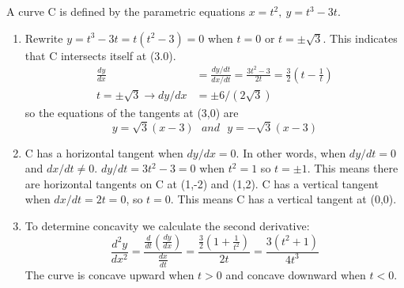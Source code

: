     \begin{solution}
      A curve C is defined by the parametric equations $ x=t^2 ,\ y=t^3 -3t $.
      \begin{enumerate}
        \item Rewrite $ y=t^3 -3t = t(t^2 -3) = 0 $ when $t=0$ or $t= \pm\sqrt{3} $. This indicates that C intersects itself at (3.0).
        \begin{align*}
          \frac{dy}{dx} &= \frac{dy/dt}{dx/dt} = \frac{3t^2 - 3}{2t} = \frac{3}{2}\left(t-\frac{1}{t}\right) \\
          t=\pm\sqrt{3} \rightarrow dy/dx &= \pm 6/(2\sqrt{3})
        \end{align*}
          so the equations of the tangents at (3,0) are
            $$ y = \sqrt{3}(x-3) \ \ \ and \ \ \ y = -\sqrt{3}(x-3) $$
        \item C has a horizontal tangent when $dy/dx=0$. In other words, when $dy/dt=0$ and $dx/dt \neq 0$. $dy/dt=3t^2 - 3 = 0$ when $t^2 = 1$ so $t=\pm 1$. This means there are horizontal tangents on C at (1,-2) and (1,2). C has a vertical tangent when $dx/dt = 2t = 0$, so $t= 0$. This means C has a vertical tangent at (0,0).
        \item To determine concavity we calculate the second derivative:
          $$ \frac{d^2 y}{dx^2} = \frac{\frac{d}{dt}\left(\frac{dy}{dx}\right)}{\frac{dx}{dt}} = \frac{\frac{3}{2}\left(1+\frac{1}{t^2}\right)}{2t} = \frac{3(t^2 + 1)}{4t^3} $$
          The curve is concave upward when $t>0$ and concave downward when $t<0$.
      \end{enumerate}
    \end{solution}

